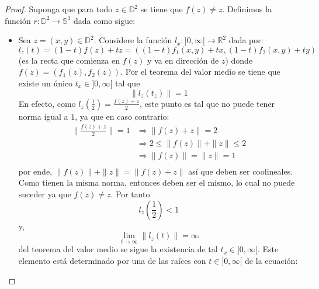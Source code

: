 \documentclass[12pt]{report}
\theoremstyle{largebreak}
\newcommand\cf[3]{\ensuremath{#1:#2\rightarrow#3}}
\begin{document}
    \begin{proof}
        Suponga que para todo $z\in\mathbb{D}^2$ se tiene que $f(z)\neq z$. Definimos la función $\cf{r}{\mathbb{D}^2}{\mathbb{S}^1}$ dada como sigue:

        \begin{itemize}
            \item Sea $z=(x,y)\in\mathbb{D}^2$. Considere la función $\cf{l_x}{]0,\infty[}{\mathbb{R}^2}$ dada por:
            \begin{equation*}
                l_z(t)=(1-t)f(z)+tz=((1-t)f_1(x,y)+tx,(1-t)f_2(x,y)+ty)
            \end{equation*}
            (es la recta que comienza en $f(z)$ y va en dirección de $z$) donde $f(z)=(f_1(z),f_2(z))$. Por el teorema del valor medio se tiene que existe un único $t_x\in]0,\infty[$ tal que
            \begin{equation*}
                \|l_z(t_z)\|=1
            \end{equation*}
            En efecto, como $l_z\left(\frac{1}{2}\right)=\frac{f(z)+z}{2}$, este punto es tal que no puede tener norma igual a $1$, ya que en caso contrario:
            \begin{equation*}
                \begin{split}
                    \|\frac{f(z)+z}{2}\|=1&\Rightarrow\|f(z)+z\|=2\\
                    &\Rightarrow2\leq\|f(z)\|+\|z\|\leq2 \\
                    &\Rightarrow\|f(z)\|=\|z\|=1 \\
                \end{split}
            \end{equation*}
            por ende, $\|f(z)\|+\|z\|=\|f(z)+z\|$ así que deben ser coolineales. Como tienen la misma norma, entonces deben ser el mismo, lo cual no puede suceder ya que $f(z)\neq z$. Por tanto
            \begin{equation*}
                l_z\left(\frac{1}{2}\right)<1
            \end{equation*}
            y,
            \begin{equation*}
                \lim_{  t\rightarrow\infty}\|l_z(t)\|=\infty
            \end{equation*}
            del teorema del valor medio se sigue la existencia de tal $t_x\in]0,\infty[$. Este elemento está determinado por una de las raíces con $t\in]0,\infty[$ de la ecuación:
            \begin{equation*}

\end{equation*}
\end{itemize}
\end{proof}
\end{document}
